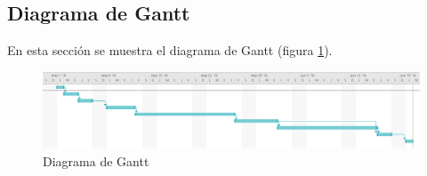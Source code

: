 \subsection{Diagrama de Gantt}

En esta sección se muestra el diagrama de Gantt (figura \ref{fig:gantt_diagram}).

\begin{figure}[!htp]
	\centering
	\includegraphics[angle=90, page=1, scale=.6]{fig/diagrama_gantt}
	\caption{Diagrama de Gantt}\label{fig:gantt_diagram}
\end{figure}
